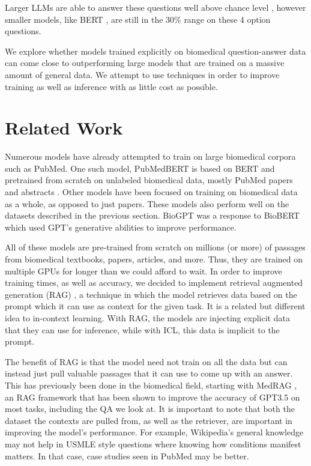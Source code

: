 \documentclass{article}
\begin{document}
Larger LLMs are able to answer these questions well above chance level \cite{liévin2023largelanguagemodelsreason}, however smaller models, like BERT \cite{devlin2019bertpretrainingdeepbidirectional}, are still in the $30\%$ range on these 4 option questions.

We explore whether models trained explicitly on biomedical question-answer data can come close to outperforming large models that are trained on a massive amount of general data. We attempt to use techniques in order to improve training as well as inference with as little cost as possible.

\section{Related Work}

Numerous models have already attempted to train on large biomedical corpora such as PubMed. One such model, PubMedBERT is based on BERT and pretrained from scratch on unlabeled biomedical data, mostly PubMed papers and abstracts \cite{Gu_2021}. Other models have been focused on training on biomedical data as a whole, as opposed to just papers. These models also perform well on the datasets described in the previous section. BioGPT \cite{Luo_2022} was a response to BioBERT \cite{Lee_2019} which used GPT's generative abilities to improve performance.

All of these models are pre-trained from scratch on millions (or more) of passages from biomedical textbooks, papers, articles, and more. Thus, they are trained on multiple GPUs for longer than we could afford to wait. In order to improve training times, as well as accuracy, we decided to implement retrieval augmented generation (RAG) \cite{lewis2021retrievalaugmentedgenerationknowledgeintensivenlp}, a technique in which the model retrieves data based on the prompt which it can use as context for the given task. It is a related but different idea to in-context learning. With RAG, the models are injecting explicit data that they can use for inference, while with ICL, this data is implicit to the prompt.

The benefit of RAG is that the model need not train on all the data but can instead just pull valuable passages that it can use to come up with an answer. This has previously been done in the biomedical field, starting with MedRAG \cite{xiong2024benchmarkingretrievalaugmentedgenerationmedicine}, an RAG framework that has been shown to improve the accuracy of GPT3.5 on most tasks, including the QA we look at. It is important to note that both the dataset the contexts are pulled from, as well as the retriever, are important in improving the model's performance. For example, Wikipedia's general knowledge may not help in USMLE style questions where knowing how conditions manifest matters. In that case, case studies seen in PubMed may be better.
\end{document}
